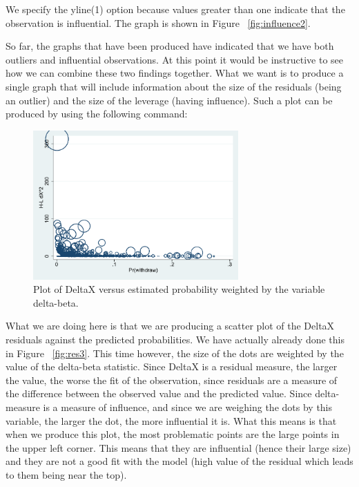\documentclass[a4paper,12pt,oneside]{book}
\begin{document}
We specify the yline(1) option because values greater than one indicate that the observation is influential. The graph is shown in Figure ~\ref{fig:influence2}.

So far, the graphs that have been produced have indicated that we have both outliers and influential observations. At this point it would be instructive to see how we can combine these two findings together. 
What we want is to produce a single graph that will include information about the size of the residuals (being an outlier) and the size of the leverage (having influence). Such a plot can be produced by using 
the following command:

\begin{stlog}\end{stlog}
\begin{figure}[h]
    \centering
    \includegraphics[width=0.7\textwidth]{book_53.pdf}
    \caption{Plot of DeltaX versus estimated probability weighted by the variable delta-beta.}
    \label{fig:influence3}
\end{figure}

What we are doing here is that we are producing a scatter plot of the DeltaX residuals against the predicted probabilities. We have actually already done this in Figure ~\ref{fig:res3}. This time however, 
the size of the dots are weighted by the value of the delta-beta statistic. Since DeltaX is a residual measure, the larger the value, the worse the fit of the observation, since residuals 
are a measure of the difference between the observed value and the predicted value. Since delta-measure is a measure of influence, and since we are weighing the dots by this variable, 
the larger the dot, the more influential it is. What this means is that when we produce this plot, the most problematic points are the large points in the upper left corner. 
This means that they are influential (hence their large size) and they are not a good fit with the model (high value of the residual which leads to them being near the top).
\end{document}
